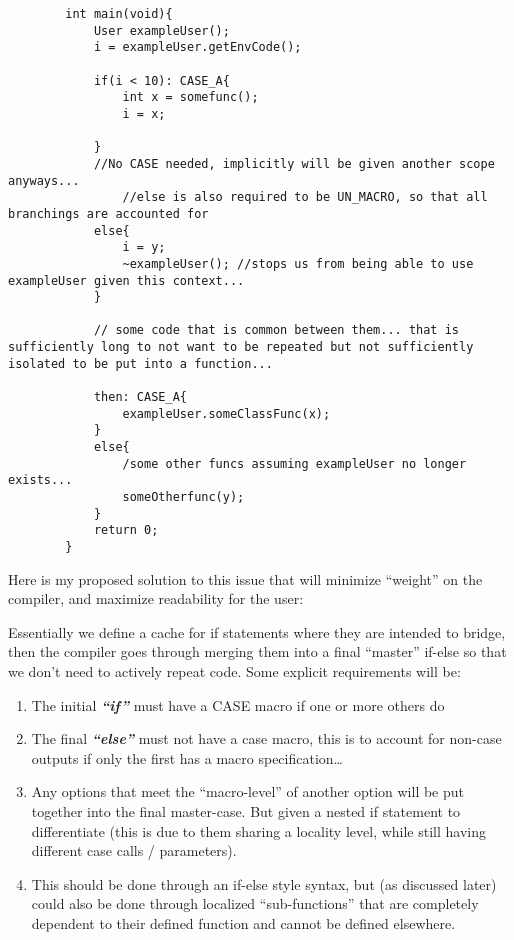 \documentclass{article}
\newcommand{\textbfit}[1]{\textbf{\textit{#1}}}
\newcommand{\clfootnote}[3]{\color{#2}{\footnote{\label{#1}{ \color{#2}{#3}}}}\color{defaultcolor}}
\begin{document}
    \begin{lstlisting}
        int main(void){
            User exampleUser();
            i = exampleUser.getEnvCode();
    
            if(i < 10): CASE_A{
                int x = somefunc();
                i = x;
    
            }
            //No CASE needed, implicitly will be given another scope anyways...
                //else is also required to be UN_MACRO, so that all branchings are accounted for
            else{
                i = y;
                ~exampleUser(); //stops us from being able to use exampleUser given this context...
            }
    
            // some code that is common between them... that is sufficiently long to not want to be repeated but not sufficiently isolated to be put into a function...
    
            then: CASE_A{
                exampleUser.someClassFunc(x);
            }
            else{
                /some other funcs assuming exampleUser no longer exists...
                someOtherfunc(y);
            }
            return 0;
        }
    \end{lstlisting}
    
        Here is my proposed solution to this issue that will minimize ``weight'' on the compiler, and maximize readability for the user:

    \bigskip
        Essentially we define a cache for if statements where they are intended to bridge, then the compiler goes through merging them into a final ``master'' if-else so that we don't need to actively repeat code. Some explicit requirements will be:

    \begin{enumerate}
        \item The initial \textbfit{``if''} must have a CASE macro if one or more others do \clfootnote{InitalProblemNote}{blue}{in the instance there is only one macro it would be recommended to make said initial if, with all subsequent being non-macro types}
        \item The final \textbfit{``else''} must not have a case macro, this is to account for non-case outputs if only the first has a macro specification\dots
        \item Any options that meet the ``macro-level'' of another option will be put together into the final master-case. But given a nested if statement to differentiate (this is due to them sharing a locality level, while still having different case calls / parameters).
        \item This should be done through an if-else style syntax, but (as discussed later) could also be done through localized ``sub-functions'' that are completely dependent to their defined function and cannot be defined elsewhere.
    \end{enumerate}
\end{document}
